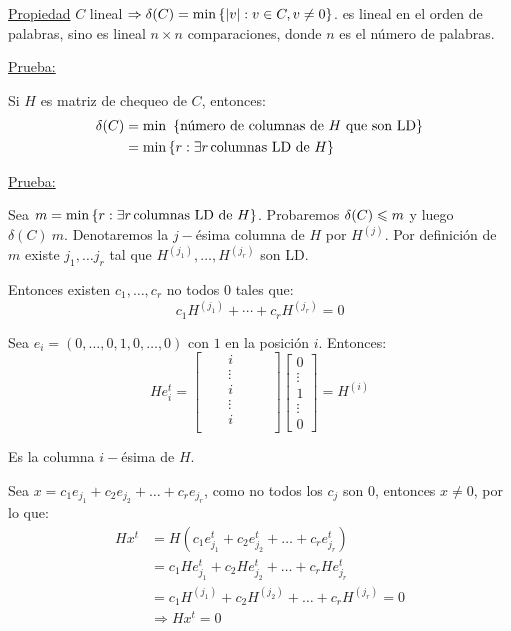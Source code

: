 \documentclass[12pt,a4paper]{article}
\begin{document}
\underline{Propiedad} $C$ lineal $\Rightarrow \delta(C) = \min \left\lbrace |v|: v\in C, v\neq 0 \right\rbrace$.
es lineal en el orden de palabras, sino es lineal $n\times n$ comparaciones, donde 
$n$ es el número de palabras.
\medskip

\underline{Prueba:}
\begin{teorema} Si $H$ es matriz de chequeo de $C$, entonces:
    \begin{align*}
        \delta(C) &= \min\,\,\left\lbrace \text{número de columnas de $H$ que son LD} \right\rbrace\\
        &= \min \left\lbrace r: \exists r\,\text{columnas LD de $H$} \right\rbrace
    \end{align*}
\end{teorema}

\underline{Prueba:}
\medskip

Sea $m = \min \left\lbrace r: \exists r\,\text{columnas LD de $H$} \right\rbrace$. Probaremos 
$\delta(C) \leqslant m$ y luego $\delta(C) \> m$. Denotaremos la $j-$ésima columna de $H$ 
por $H^{(j)}$. Por definición de $m$ existe $j_{1},\ldots j_{r}$ tal que 
$H^{(j_{1})},\ldots, H^{(j_{r})}$ son LD.
\medskip

Entonces existen $c_{1},\ldots, c_{r}$ no todos $0$ tales que:
$$c_{1}H^{(j_{1})} + \cdots + c_{r}H^{(j_{r})} = 0$$

Sea $e_{i} = (0,\ldots,0,1,0,\ldots,0)$ con $1$ en la posición $i$. Entonces:
\begin{equation*}
    He_{i}^{t} =
    \begin{bmatrix}
        &   & i      &   &   & \\
        &   & \vdots &   &   & \\
        &   & i      &   &   & \\
        &   & \vdots &   &   & \\
        &   & i      &   &   & \\
    \end{bmatrix}
    \begin{bmatrix}
        0\\
        \vdots\\
        1\\
        \vdots\\
        0
    \end{bmatrix}
    =
    H^{(i)}
\end{equation*}

Es la columna $i-$ésima de $H$.
\medskip

Sea $x = c_{1}e_{j_{1}}+c_{2}e_{j_{2}}+\ldots + c_{r}e_{j_{r}}$, como no todos
los $c_{j}$ son $0$, entonces $x \neq 0$, por lo que:
\begin{align*}
    Hx^{t} &= H(c_{1}e_{j_{1}}^{t}+c_{2}e_{j_{2}}^{t}+\ldots + c_{r}e_{j_{r}}^{t})\\
    &= c_{1}He_{j_{1}}^{t}+c_{2}He_{j_{2}}^{t}+\ldots + c_{r}He_{j_{r}}^{t} \\
    &= c_{1}H^{(j_{1})} + c_{2}H^{(j_{2})} +\ldots + c_{r}H^{(j_{r})} = 0\\
    &\Rightarrow Hx^{t} = 0 
\end{align*}
\end{document}
